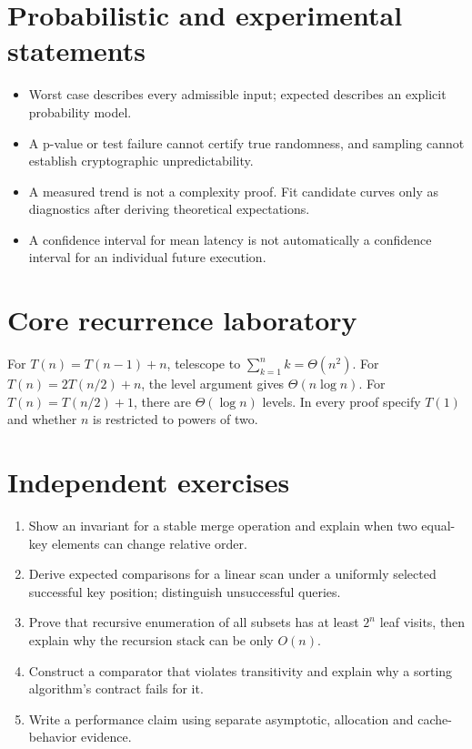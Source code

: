 \documentclass[11pt,letterpaper]{article}
\begin{document}
\section{Probabilistic and experimental statements}
\begin{itemize}\item Worst case describes every admissible input; expected describes an explicit probability model.
\item A p-value or test failure cannot certify true randomness, and sampling cannot establish cryptographic unpredictability.
\item A measured trend is not a complexity proof. Fit candidate curves only as diagnostics after deriving theoretical expectations.
\item A confidence interval for mean latency is not automatically a confidence interval for an individual future execution.
\end{itemize}
\section{Core recurrence laboratory}
For $T(n)=T(n-1)+n$, telescope to $\sum_{k=1}^{n}k=\Theta(n^2)$. For $T(n)=2T(n/2)+n$, the level argument gives $\Theta(n\log n)$. For $T(n)=T(n/2)+1$, there are $\Theta(\log n)$ levels. In every proof specify $T(1)$ and whether $n$ is restricted to powers of two.
\section{Independent exercises}
\begin{enumerate}
\item Show an invariant for a stable merge operation and explain when two equal-key elements can change relative order.
\item Derive expected comparisons for a linear scan under a uniformly selected successful key position; distinguish unsuccessful queries.
\item Prove that recursive enumeration of all subsets has at least $2^n$ leaf visits, then explain why the recursion stack can be only $O(n)$.
\item Construct a comparator that violates transitivity and explain why a sorting algorithm's contract fails for it.
\item Write a performance claim using separate asymptotic, allocation and cache-behavior evidence.
\end{enumerate}
\end{document}
